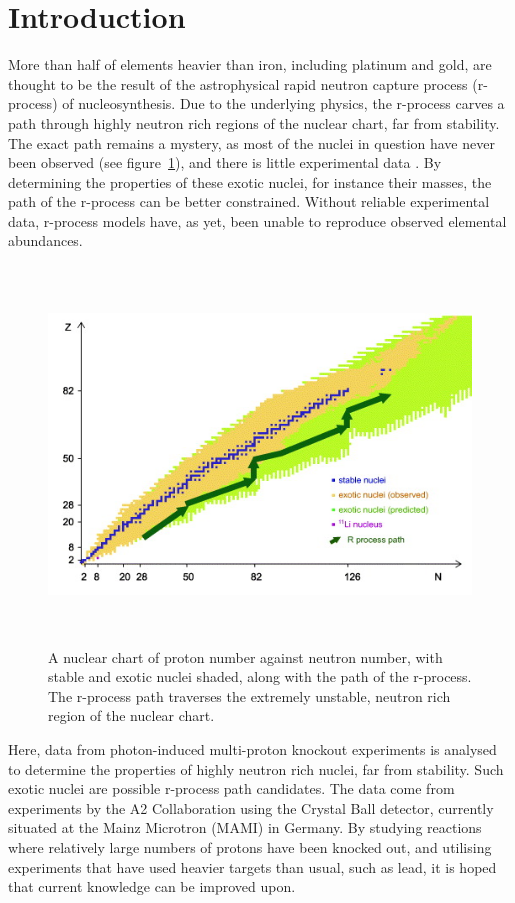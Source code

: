 \documentclass[a4paper,12pt]{article}
\begin{document}
\section{Introduction}
More than half of elements heavier than iron, including platinum and gold, are thought to be the result of the astrophysical rapid neutron capture process (r-process) of nucleosynthesis. Due to the underlying physics, the r-process carves a path through highly neutron rich regions of the nuclear chart, far from stability. The exact path remains a mystery, as most of the nuclei in question have never been observed (see figure~\ref{fig:unknownChart}), and there is little experimental data \cite{cowan}{}. By determining the properties of these exotic nuclei, for instance their masses, the path of the r-process can be better constrained. Without reliable experimental data, r-process models have, as yet, been unable to reproduce observed elemental abundances.

\begin{figure}[h]
\label{fig:unknownChart}
\centering
\includegraphics[height=10cm]{nuclearChart}
\caption{A nuclear chart of proton number against neutron number, with stable and exotic nuclei shaded, along with the path of the r-process. The r-process path traverses the extremely unstable, neutron rich region of the nuclear chart\cite{otsuka}{}.}
\end{figure}


Here, data from photon-induced multi-proton knockout experiments is analysed to determine the properties of highly neutron rich nuclei, far from stability. Such exotic nuclei are possible r-process path candidates. The data come from experiments by the A2 Collaboration using the Crystal Ball detector, currently situated at the Mainz Microtron (MAMI) in Germany. By studying reactions where relatively large numbers of protons have been knocked out, and utilising experiments that have used heavier targets than usual, such as lead, it is hoped that current knowledge can be improved upon.  
\end{document}
